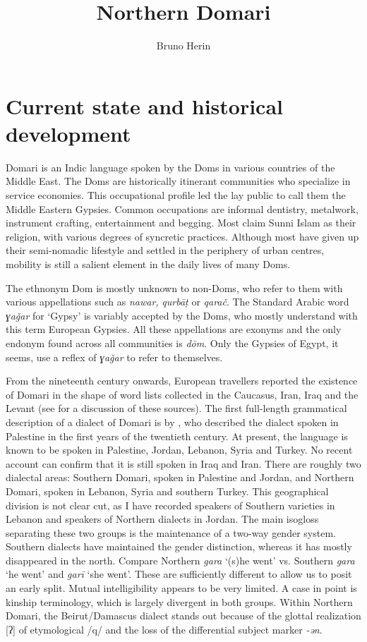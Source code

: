 \documentclass[output=paper]{langsci/langscibook}
\author{Bruno Herin\affiliation{Inalco, IUF}}
\title{Northern Domari}
\begin{document}
\maketitle
 
\section{Current state and historical development}

Domari is an Indic language spoken by the Doms in various countries of the Middle East. The Doms are historically itinerant communities who specialize in service economies. This occupational profile led the lay public to call them the Middle Eastern Gypsies. Common occupations are informal dentistry, metalwork, instrument crafting, entertainment and begging. Most claim Sunni Islam as their religion, with various degrees of syncretic practices. Although most have given up their semi-nomadic lifestyle and settled in the periphery of urban centres, mobility is still a salient element in the daily lives of many Doms.

The ethnonym Dom is mostly unknown to non-Doms, who refer to them with various appellations such as \textit{nawar,} \textit{qurbāṭ} or \textit{qarač}. The Standard Arabic word \textit{ɣa\v{g}ar} for `Gypsy' is variably accepted by the Doms, who mostly understand with this term European Gypsies. All these appellations are exonyms and the only endonym found across all communities is \textit{dōm}. Only the Gypsies of Egypt, it seems, use a reflex of \textit{ɣa\v{g}ar} to refer to themselves. 

From the nineteenth century onwards, European travellers reported the existence of Domari in the shape of word lists collected in the Caucasus, Iran, Iraq and the Levant (see \citealt{Herin2012} for a discussion of these sources). The first full-length grammatical description of a dialect of Domari is by \citet{Macalister1914}, who described the dialect spoken in Palestine in the first years of the twentieth century. At present, the language is known to be spoken in Palestine, Jordan, Lebanon, Syria and Turkey. No recent account can confirm that it is still spoken in Iraq and Iran. There are roughly two dialectal areas:  Southern Domari, spoken in Palestine and Jordan, and Northern Domari, spoken in Lebanon, Syria and southern Turkey. This geographical division is not clear cut, as I have recorded speakers of Southern varieties in Lebanon and speakers of Northern dialects in Jordan. The main isogloss separating these two groups is the maintenance of a two-way gender system. Southern dialects have maintained the gender distinction, whereas it has mostly disappeared in the north. Compare Northern \textit{gara} ‘(s)he went’ vs. Southern \textit{gara} ‘he went’ and \textit{garī} ‘she went’. These are sufficiently different to allow us to posit an early split. Mutual intelligibility appears to be very limited. A case in point is kinship terminology, which is largely divergent in both groups. Within Northern Domari, the Beirut/Damascus dialect stands out because of the glottal realization [ʔ] of etymological /q/ and the loss of the differential subject marker \textit{-ən}. 
\end{document}
